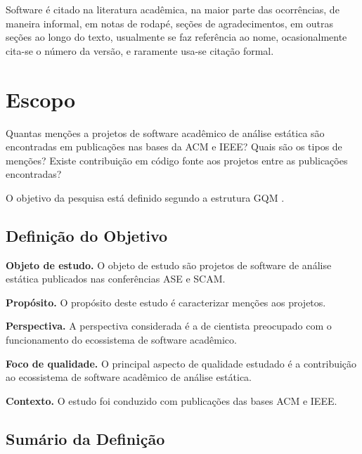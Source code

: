Software é citado na literatura acadêmica, na maior parte das ocorrências, de
maneira informal, em notas de rodapé, seções de agradecimentos, em outras
seções ao longo do texto, usualmente se faz referência ao nome, ocasionalmente
cita-se o número da versão, e raramente usa-se citação formal.


\section{Escopo} \label{estudo2:escopo} %

Quantas menções a projetos de software acadêmico de análise estática são
encontradas em publicações nas bases da ACM e IEEE? Quais são os tipos de
menções? Existe contribuição em código fonte aos projetos entre as publicações
encontradas?

O objetivo da pesquisa está definido segundo a estrutura GQM \cite{basili1994goal}.

\subsection{Definição do Objetivo}

\begin{description}
\item{\bf Objeto de estudo.} 
O objeto de estudo são projetos de software de análise estática publicados nas conferências ASE e SCAM.

\item{\bf Propósito.} 
O propósito deste estudo é caracterizar menções aos projetos.

\item{\bf Perspectiva.} 
A perspectiva considerada é a de cientista preocupado com o funcionamento do ecossistema de software acadêmico.

\item{\bf Foco de qualidade.} 
O principal aspecto de qualidade estudado é a contribuição ao ecossistema de software acadêmico de análise estática.

\item{\bf Contexto.} 
O estudo foi conduzido com publicações das bases ACM e IEEE.
\end{description}

\subsection{Sumário da Definição}

